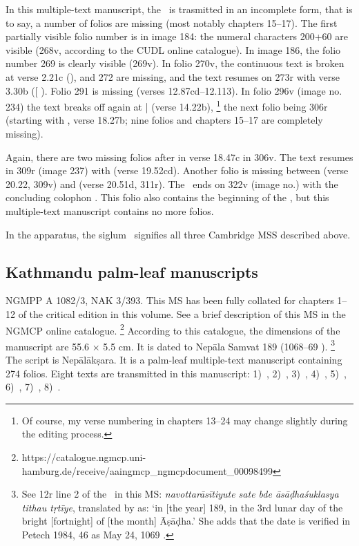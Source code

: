 In this multiple-text manuscript, the \VSS\ is trasmitted in an incomplete
form, that is to say, a number of folios are missing (most notably
chapters 15--17). The first partially visible folio number is in image
184: the numeral characters 200+60 are visible (268v, according to the
CUDL online catalogue). In image 186, the folio number 269 is clearly
visible (\fol269v). In folio 270v, the continuous text is broken at verse
2.21c (),  and 272 are missing, and the text
resumes on \fol273r with verse 3.30b ({[}\skt{ahiṃsā
pa}{]} ). Folio 291 is missing (verses
12.87cd--12.113). In folio 296v (image no. 234) the text breaks off
again at  |  (verse 14.22b),%
        \footnote{Of course, my verse numbering in chapters 13--24 may change slightly
                  during the editing process.}
the next folio being 306r (starting with ,
verse 18.27b; nine folios and chapters 15--17 are completely
missing).

Again, there are two missing folios after  in
verse 18.47c in \fol306v. The text resumes in \fol309r (image 237)
with  (verse 19.52cd). Another folio is missing between  (verse
20.22, \fol309v) and  (verse 20.51d, \fol311r). The \VSS\ ends on \fol322v (image no.) with the
concluding colophon . 
This folio also contains the beginning of the , 
but this multiple-text manuscript contains no more folios.

In the apparatus, the siglum \mssCaCbCc\ signifies all three Cambridge 
MSS described above.

\medskip
\subsection{Kathmandu palm-leaf manuscripts}
NGMPP A 1082/3, NAK 3/393. This MS has been fully 
collated for chapters 1--12 of the critical edition in this volume. 
See a brief description of this MS in
the NGMCP online catalogue.%
	\footnote{https://catalogue.ngmcp.uni-hamburg.de/receive/aaingmcp\_ngmcpdocument\_00098499}
According to this catalogue, the dimensions of the 
manuscript are 55.6 × 5.5 cm. 
It is dated to Nepāla Samvat 189 (1068--69 \CE).%
	\footnote{See \fol12r line 2 of the 
	\DharmP\ in this MS: 
	\emph{navottarāsītiyute sate bde āsāḍhaśuklasya
  tithau tṛtīye}, translated by  as: 
  `in {[}the year{]} 189, in the 3rd lunar day of the bright {[}fortnight{]}
  of {[}the month{]} Āṣāḍha.' She adds that the date is verified in
  Petech 1984, 46 as May 24, 1069 \CE.} The script is Nepālākṣara. It is
a palm-leaf multiple-text manuscript containing 274 folios. Eight texts
are transmitted in this manuscript: 
1)~\SDhS,
2)~\SDhU,
3)~\SDhSangr,
4)~\Ums,
5)~\SivaUp,
6)~\Vss,
7)~\DharmP,
8)~\Uums.

